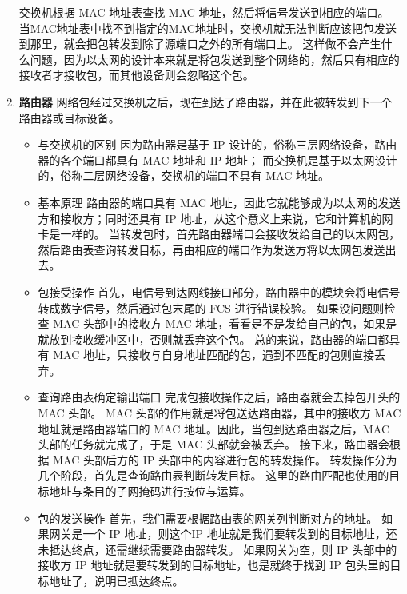 \documentclass[11pt]{article}
\begin{document}
\begin{enumerate}
交换机根据 MAC 地址表查找 MAC 地址，然后将信号发送到相应的端口。
当MAC地址表中找不到指定的MAC地址时，交换机就无法判断应该把包发送到那里，就会把包转发到除了源端口之外的所有端口上。
这样做不会产生什么问题，因为以太网的设计本来就是将包发送到整个网络的，然后只有相应的接收者才接收包，而其他设备则会忽略这个包。
\item \textbf{路由器}
网络包经过交换机之后，现在到达了路由器，并在此被转发到下一个路由器或目标设备。
\begin{itemize}
\item 与交换机的区别
因为路由器是基于 IP 设计的，俗称三层网络设备，路由器的各个端口都具有 MAC 地址和 IP 地址；
而交换机是基于以太网设计的，俗称二层网络设备，交换机的端口不具有 MAC 地址。

\item 基本原理
路由器的端口具有 MAC 地址，因此它就能够成为以太网的发送方和接收方；同时还具有 IP 地址，从这个意义上来说，它和计算机的网卡是一样的。
当转发包时，首先路由器端口会接收发给自己的以太网包，然后路由表查询转发目标，再由相应的端口作为发送方将以太网包发送出去。
\item 包接受操作
首先，电信号到达网线接口部分，路由器中的模块会将电信号转成数字信号，然后通过包末尾的 FCS 进行错误校验。
如果没问题则检查 MAC 头部中的接收方 MAC 地址，看看是不是发给自己的包，如果是就放到接收缓冲区中，否则就丢弃这个包。
总的来说，路由器的端口都具有 MAC 地址，只接收与自身地址匹配的包，遇到不匹配的包则直接丢弃。
\item 查询路由表确定输出端口
完成包接收操作之后，路由器就会去掉包开头的 MAC 头部。
MAC 头部的作用就是将包送达路由器，其中的接收方 MAC 地址就是路由器端口的 MAC 地址。因此，当包到达路由器之后，MAC 头部的任务就完成了，于是 MAC 头部就会被丢弃。
接下来，路由器会根据 MAC 头部后方的 IP 头部中的内容进行包的转发操作。
转发操作分为几个阶段，首先是查询路由表判断转发目标。
这里的路由匹配也使用的目标地址与条目的子网掩码进行按位与运算。
\item 包的发送操作
首先，我们需要根据路由表的网关列判断对方的地址。
如果网关是一个 IP 地址，则这个IP 地址就是我们要转发到的目标地址，还未抵达终点，还需继续需要路由器转发。
如果网关为空，则 IP 头部中的接收方 IP 地址就是要转发到的目标地址，也是就终于找到 IP 包头里的目标地址了，说明已抵达终点。
\end{itemize}


\end{enumerate}
\end{document}
